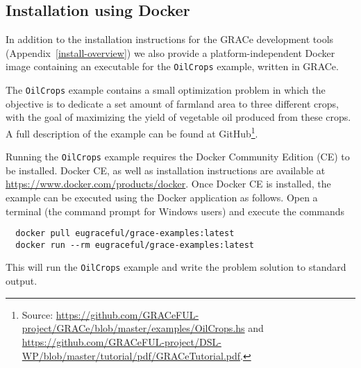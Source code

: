 
\subsection{Installation using Docker}
\label{install-docker}

In addition to the installation instructions for the GRACe development tools
(Appendix~\ref{install-overview}) we also provide a platform-independent Docker
image containing an executable for the \verb!OilCrops! example, written in
GRACe.

The \verb!OilCrops! example contains a small optimization problem in
which the objective is to dedicate a set amount of farmland area to
three different crops, with the goal of maximizing the yield of
vegetable oil produced from these crops. A full description of the
example can be found at GitHub\footnote{Source:
  \url{https://github.com/GRACeFUL-project/GRACe/blob/master/examples/OilCrops.hs} and \url{https://github.com/GRACeFUL-project/DSL-WP/blob/master/tutorial/pdf/GRACeTutorial.pdf}.}.

Running the \verb!OilCrops! example requires the Docker Community Edition (CE)
to be installed. Docker CE, as well as installation instructions are available
at \url{https://www.docker.com/products/docker}. Once Docker CE is installed,
the example can be executed using the Docker application as follows. Open a
terminal (the command prompt for Windows users) and execute the commands
%
\begin{verbatim}
  docker pull eugraceful/grace-examples:latest
  docker run --rm eugraceful/grace-examples:latest
\end{verbatim}

\noindent
This will run the \verb!OilCrops! example and write the problem solution to
standard output.

